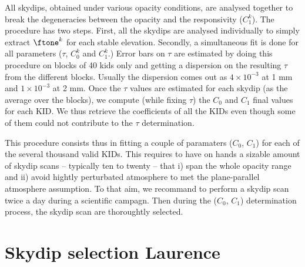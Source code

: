 All skydips, obtained under various opacity
conditions, are analysed together to break the degeneracies between
the opacity and the responsivity ($C_1^k$). The procedure has two steps.
First, all the skydips are analysed individually to simply extract
$\ftone^k$ for each stable elevation. Secondly, a simultaneous fit is done
for all 
parameters ($\tau$, $C_0^k$ and $C_1^k$.)
Error bars on $\tau$ are estimated by doing
this procedure on blocks of 40 kids only and getting a dispersion on the
resulting $\tau$ from the different blocks. Usually the dispersion comes out as
$4\times 10^{-3}$ at 1 mm and $1\times 10^{-3}$ at 2 mm. Once the $\tau$ values
are estimated for each skydip (as the average over the blocks), we compute
(while fixing $\tau$) the $C_0$ and $C_1$ final values for each KID. We thus
retrieve the coefficients of all the KIDs even though some of them could not
contribute to the $\tau$ determination.

This procedure consists thus in fitting a couple of paramaters ($C_0$,
$C_1$) for each of the several thousand valid KIDs. This requires to
have on hands a sizable amount of skydip scans -- typically ten to
twenty -- that i) span the whole opacity range and ii) avoid hightly
perturbated atmosphere to met the plane-parallel atmosphere
assumption. To that aim, we recommand to perform a skydip scan twice a
day during a scientific campagn. Then during the ($C_0$, $C_1$)
determination process, the skydip scan are thoroughtly selected.

   
\section{Skydip selection {\color{blue} Laurence}}
\label{se:skydip-selection}

